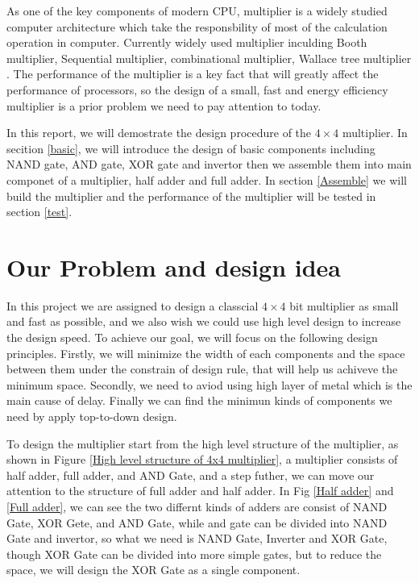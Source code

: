 \documentclass[conference]{IEEEtran}
\begin{document}

As one of the key components of modern CPU, multiplier is a widely studied computer architecture which take the responsbility of most of the calculation operation in computer. Currently widely used multiplier inculding Booth multiplier, Sequential multiplier, combinational multiplier, Wallace tree multiplier \cite{a1}. The performance of the multiplier is a key fact that will greatly affect the performance of processors, so the design of a small, fast and energy efficiency multiplier is a prior problem we need to pay attention to today.

In this report, we will demostrate the design procedure of the $4 \times 4$ multiplier. In secition \ref{basic}, we will introduce the design of basic components including NAND gate, AND gate, XOR gate and invertor then we assemble them into main componet of a multiplier, half adder and full adder. In section \ref{Assemble} we will build the multiplier and the performance of the multiplier will be tested in section \ref{test}.

\section{Our Problem and design idea}


In this project we are assigned to design a classcial $ 4 \times 4 $ bit multiplier as small and fast as possible, and we also wish we could use high level design to increase the design speed. To achieve our goal, we will focus on the following design principles. Firstly, we will minimize the width of each components and the space between them under the constrain of design rule, that will help us achiveve the minimum space. Secondly, we need to aviod using high layer of metal which is the main cause of delay. Finally we can find the minimun kinds of components we need by apply top-to-down design. 

To design the multiplier start from the high level structure of the multiplier, as shown in Figure \ref{High level structure of 4x4 multiplier}, a multiplier consists of half adder, full adder, and AND Gate, and a step futher, we can move our attention to the structure of full adder and half adder. In Fig \ref{Half adder} and \ref{Full adder}, we can see the two differnt kinds of adders are consist of NAND Gate, XOR Gete, and AND Gate, while and gate can be divided into NAND Gate and invertor, so what we need is NAND Gate, Inverter and XOR Gate, though XOR Gate can be divided into more simple gates, but to reduce the space, we will design the XOR Gate as a single component.
\end{document}
